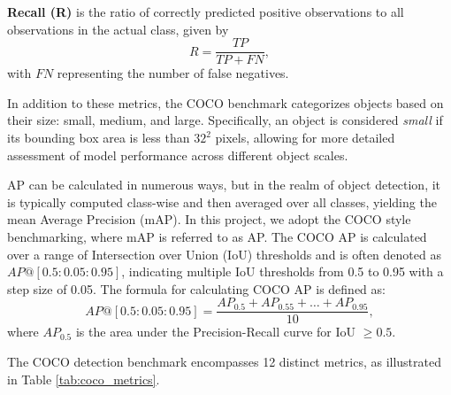 \documentclass[report.tex]{subfiles}
\begin{document}
    \textbf{Recall (R)} is the ratio of correctly predicted positive observations to all observations in the actual class, given by 
    \begin{equation}
        R = \frac{TP}{TP + FN},
    \end{equation}
    with \( FN \) representing the number of false negatives.

    In addition to these metrics, the COCO benchmark categorizes objects based on their size: small, medium, and large. Specifically, an object is considered \textit{small} if its bounding box area is less than \( 32^2 \) pixels, allowing for more detailed assessment of model performance across different object scales.

    AP can be calculated in numerous ways, but in the realm of object detection, it is typically computed class-wise and then averaged over all classes, yielding the mean Average Precision (mAP). In this project, we adopt the COCO style benchmarking, where mAP is referred to as AP. The COCO AP is calculated over a range of Intersection over Union (IoU) thresholds and is often denoted as \( AP@[0.5:0.05:0.95] \), indicating multiple IoU thresholds from 0.5 to 0.95 with a step size of 0.05. The formula for calculating COCO AP is defined as:
    \begin{equation}
        AP@[0.5:0.05:0.95] = \frac{AP_{0.5} + AP_{0.55} + \ldots + AP_{0.95}}{10},
    \end{equation}
    where \( AP_{0.5} \) is the area under the Precision-Recall curve for IoU \(\geq 0.5\). 

    
    The COCO detection benchmark encompasses 12 distinct metrics, as illustrated in Table \ref{tab:coco_metrics}.
\end{document}
